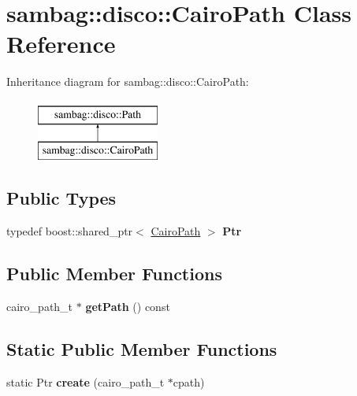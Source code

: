 \hypertarget{classsambag_1_1disco_1_1_cairo_path}{
\section{sambag::disco::CairoPath Class Reference}
\label{classsambag_1_1disco_1_1_cairo_path}
}
Inheritance diagram for sambag::disco::CairoPath:\begin{figure}[H]
\begin{center}
\leavevmode
\includegraphics[height=2.000000cm]{classsambag_1_1disco_1_1_cairo_path}
\end{center}
\end{figure}
\subsection*{Public Types}
\begin{DoxyCompactItemize}
\item 
\hypertarget{classsambag_1_1disco_1_1_cairo_path_aa6d7280c93ef31a9d2d4d6ba0dbe3645}{
typedef boost::shared\_\-ptr$<$ \hyperlink{classsambag_1_1disco_1_1_cairo_path}{CairoPath} $>$ {\bfseries Ptr}}
\label{classsambag_1_1disco_1_1_cairo_path_aa6d7280c93ef31a9d2d4d6ba0dbe3645}

\end{DoxyCompactItemize}
\subsection*{Public Member Functions}
\begin{DoxyCompactItemize}
\item 
\hypertarget{classsambag_1_1disco_1_1_cairo_path_abf652cc5504026487e53f4c96420c024}{
cairo\_\-path\_\-t $\ast$ {\bfseries getPath} () const }
\label{classsambag_1_1disco_1_1_cairo_path_abf652cc5504026487e53f4c96420c024}

\end{DoxyCompactItemize}
\subsection*{Static Public Member Functions}
\begin{DoxyCompactItemize}
\item 
\hypertarget{classsambag_1_1disco_1_1_cairo_path_af3760f853aaaf862bc081f6ca87f3fab}{
static Ptr {\bfseries create} (cairo\_\-path\_\-t $\ast$cpath)}
\label{classsambag_1_1disco_1_1_cairo_path_af3760f853aaaf862bc081f6ca87f3fab}

\end{DoxyCompactItemize}
